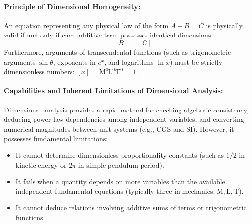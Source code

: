 \documentclass[10pt,twoside,openright]{book}
\begin{document}
\paragraph{Principle of Dimensional Homogeneity:} An equation representing any physical law of the form $A + B = C$ is physically valid if and only if each additive term possesses identical dimensions:
\begin{equation}
  [A] = [B] = [C]
\end{equation}
Furthermore, arguments of transcendental functions (such as trigonometric arguments $\sin\theta$, exponents in $e^x$, and logarithms $\ln x$) must be strictly dimensionless numbers: $[x] = \mathrm{M}^0\mathrm{L}^0\mathrm{T}^0 = 1$.

\paragraph{Capabilities and Inherent Limitations of Dimensional Analysis:}
Dimensional analysis provides a rapid method for checking algebraic consistency, deducing power-law dependencies among independent variables, and converting numerical magnitudes between unit systems (e.g., CGS and SI). However, it possesses fundamental limitations:
\begin{itemize}
  \item It cannot determine dimensionless proportionality constants (such as $1/2$ in kinetic energy or $2\pi$ in simple pendulum period).
  \item It fails when a quantity depends on more variables than the available independent fundamental equations (typically three in mechanics: $\mathrm{M, L, T}$).
  \item It cannot deduce relations involving additive sums of terms or trigonometric functions.
\end{itemize}
\end{document}
